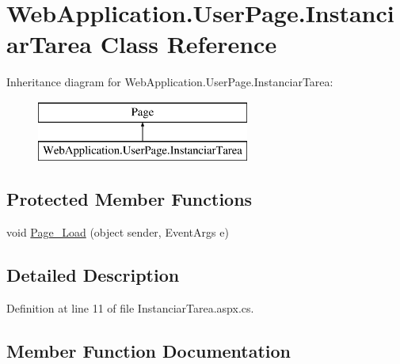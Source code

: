 \hypertarget{classWebApplication_1_1UserPage_1_1InstanciarTarea}{}\section{Web\+Application.\+User\+Page.\+Instanciar\+Tarea Class Reference}
\label{classWebApplication_1_1UserPage_1_1InstanciarTarea}
Inheritance diagram for Web\+Application.\+User\+Page.\+Instanciar\+Tarea\+:\begin{figure}[H]
\begin{center}
\leavevmode
\includegraphics[height=2.000000cm]{d8/dfd/classWebApplication_1_1UserPage_1_1InstanciarTarea}
\end{center}
\end{figure}
\subsection*{Protected Member Functions}
\begin{DoxyCompactItemize}
\item 
void \mbox{\hyperlink{classWebApplication_1_1UserPage_1_1InstanciarTarea_afd68741b2820aa5498ccd334a06b77c2}{Page\+\_\+\+Load}} (object sender, Event\+Args e)
\end{DoxyCompactItemize}


\subsection{Detailed Description}


Definition at line 11 of file Instanciar\+Tarea.\+aspx.\+cs.



\subsection{Member Function Documentation}
\mbox{\label{classWebApplication_1_1UserPage_1_1InstanciarTarea_afd68741b2820aa5498ccd334a06b77c2}} 

